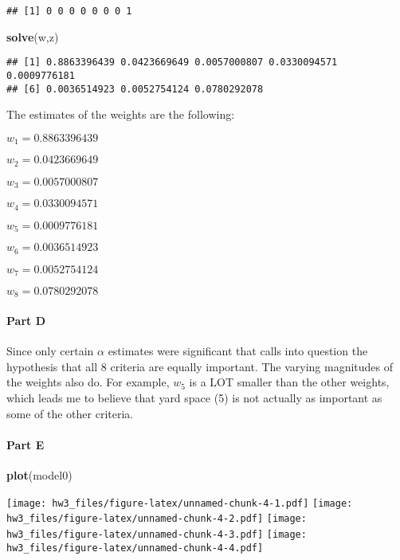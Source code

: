 \documentclass[
]{article}
\newenvironment{Shaded}{\begin{snugshade}}{\end{snugshade}}
\newcommand{\KeywordTok}[1]{\textcolor[rgb]{0.13,0.29,0.53}{\textbf{#1}}}
\newcommand{\NormalTok}[1]{#1}
\begin{document}
\begin{verbatim}
## [1] 0 0 0 0 0 0 0 1
\end{verbatim}

\begin{Shaded}
\begin{Highlighting}[]
\KeywordTok{solve}\NormalTok{(w,z)}
\end{Highlighting}
\end{Shaded}

\begin{verbatim}
## [1] 0.8863396439 0.0423669649 0.0057000807 0.0330094571 0.0009776181
## [6] 0.0036514923 0.0052754124 0.0780292078
\end{verbatim}

The estimates of the weights are the following:

\(w_1 = 0.8863396439\)

\(w_2 = 0.0423669649\)

\(w_3 = 0.0057000807\)

\(w_4 = 0.0330094571\)

\(w_5 = 0.0009776181\)

\(w_6 = 0.0036514923\)

\(w_7 = 0.0052754124\)

\(w_8 = 0.0780292078\)

\hypertarget{part-d}{%
\paragraph{Part D}\label{part-d}}

Since only certain \(\alpha\) estimates were significant that calls into
question the hypothesis that all 8 criteria are equally important. The
varying magnitudes of the weights also do. For example, \(w_5\) is a LOT
smaller than the other weights, which leads me to believe that yard
space (5) is not actually as important as some of the other criteria.

\hypertarget{part-e}{%
\paragraph{Part E}\label{part-e}}

\begin{Shaded}
\begin{Highlighting}[]
\KeywordTok{plot}\NormalTok{(model0)}
\end{Highlighting}
\end{Shaded}

\texttt{[image: hw3\_files/figure-latex/unnamed-chunk-4-1.pdf]}
\texttt{[image: hw3\_files/figure-latex/unnamed-chunk-4-2.pdf]}
\texttt{[image: hw3\_files/figure-latex/unnamed-chunk-4-3.pdf]}
\texttt{[image: hw3\_files/figure-latex/unnamed-chunk-4-4.pdf]}
\end{document}
